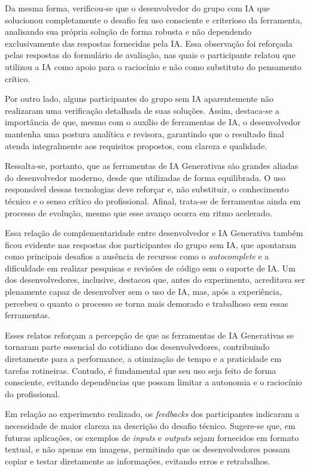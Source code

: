 \documentclass[english,brazilian]{UNISINOSartigo} %
\begin{document}
Da mesma forma, verificou-se que o desenvolvedor do grupo com IA que solucionou completamente o desafio fez uso consciente e criterioso da ferramenta, analisando sua própria solução de forma robusta e não dependendo exclusivamente das respostas fornecidas pela IA. Essa observação foi reforçada pelas respostas do formulário de avaliação, nas quais o participante relatou que utilizou a IA como apoio para o raciocínio e não como substituto do pensamento crítico.

Por outro lado, alguns participantes do grupo sem IA aparentemente não realizaram uma verificação detalhada de suas soluções. Assim, destaca-se a importância de que, mesmo com o auxílio de ferramentas de IA, o desenvolvedor mantenha uma postura analítica e revisora, garantindo que o resultado final atenda integralmente aos requisitos propostos, com clareza e qualidade.

Ressalta-se, portanto, que as ferramentas de IA Generativas são grandes aliadas do desenvolvedor moderno, desde que utilizadas de forma equilibrada. O uso responsável dessas tecnologias deve reforçar e, não substituir, o conhecimento técnico e o senso crítico do profissional. Afinal, trata-se de ferramentas ainda em processo de evolução, mesmo que esse avanço ocorra em ritmo acelerado.

Essa relação de complementaridade entre desenvolvedor e IA Generativa também ficou evidente nas respostas dos participantes do grupo sem IA, que apontaram como principais desafios a ausência de recursos como o \textit{autocomplete} e a dificuldade em realizar pesquisas e revisões de código sem o suporte de IA. Um dos desenvolvedores, inclusive, destacou que, antes do experimento, acreditava ser plenamente capaz de desenvolver sem o uso de IA, mas, após a experiência, percebeu o quanto o processo se torna mais demorado e trabalhoso sem essas ferramentas.

Esses relatos reforçam a percepção de que as ferramentas de IA Generativas se tornaram parte essencial do cotidiano dos desenvolvedores, contribuindo diretamente para a performance, a otimização de tempo e a praticidade em tarefas rotineiras. Contudo, é fundamental que seu uso seja feito de forma consciente, evitando dependências que possam limitar a autonomia e o raciocínio do profissional.

Em relação ao experimento realizado, os \textit{feedbacks} dos participantes indicaram a necessidade de maior clareza na descrição do desafio técnico. Sugere-se que, em futuras aplicações, os exemplos de \textit{inputs} e \textit{outputs} sejam fornecidos em formato textual, e não apenas em imagens, permitindo que os desenvolvedores possam copiar e testar diretamente as informações, evitando erros e retrabalhos.
\end{document}

